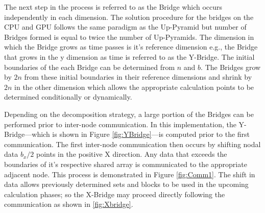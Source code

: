 \documentclass[review]{elsarticle}
\begin{document}
\par The next step in the process is referred to as the Bridge which occurs independently in each dimension. The solution procedure for the bridges on the CPU and GPU follows the same paradigm as the Up-Pyramid but number of Bridges formed is equal to twice the number of Up-Pyramids. The dimension in which the Bridge grows as time passes is it's reference dimension e.g., the Bridge that grows in the y dimension as time is referred to as the Y-Bridge. The initial boundaries of the each Bridge can be determined from $n$ and $b$. The Bridges grow by $2n$ from these initial boundaries in their reference dimensions and shrink by $2n$ in the other dimension which allows the appropriate calculation points to be determined conditionally or dynamically.

\par
Depending on the decomposition strategy, a large portion of the Bridges can be performed prior to inter-node communication. In this implementation, the Y-Bridge---which is shown in Figure \ref{fig:YBridge}---is computed prior to the first communication. The first inter-node communication then occurs by shifting nodal data $b_x/2$ points in the positive X direction. Any data that exceeds the boundaries of it's respective shared array is communicated to the appropriate adjacent node. This process is demonstrated in Figure \ref{fig:Comm1}. The shift in data allows previously determined sets and blocks to be used in the upcoming calculation phases; so the X-Bridge may proceed directly following the communication as shown in \ref{fig:Xbridge}.
\end{document}
